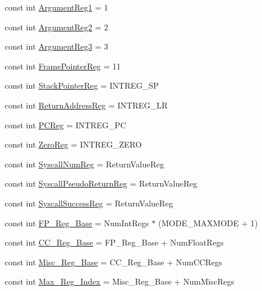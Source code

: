 \begin{DoxyCompactItemize}
const int \hyperlink{namespaceArmISA_af987b699db00f70e6b0d77312e87b602}{ArgumentReg1} = 1
\item 
const int \hyperlink{namespaceArmISA_a9228292e340b262f43392ff8b1e439db}{ArgumentReg2} = 2
\item 
const int \hyperlink{namespaceArmISA_a951253d463ad7c65cb79fc65b97df41c}{ArgumentReg3} = 3
\item 
const int \hyperlink{namespaceArmISA_aabd6fa5889c9ccc124dfd4a984046f6f}{FramePointerReg} = 11
\item 
const int \hyperlink{namespaceArmISA_a95d0846360ad0e64cb42fda7268a6434}{StackPointerReg} = INTREG\_\-SP
\item 
const int \hyperlink{namespaceArmISA_a99ba4a35fbf9debeb1f7ddb1db7b9967}{ReturnAddressReg} = INTREG\_\-LR
\item 
const int \hyperlink{namespaceArmISA_a48a12b34df10db73eb0f38fbc8d3820f}{PCReg} = INTREG\_\-PC
\item 
const int \hyperlink{namespaceArmISA_a33dbba4a12f6733a5ecc2d2b3542b7ee}{ZeroReg} = INTREG\_\-ZERO
\item 
const int \hyperlink{namespaceArmISA_ab258e2663398d45bb2996ff71313c4db}{SyscallNumReg} = ReturnValueReg
\item 
const int \hyperlink{namespaceArmISA_ab566b6da98edbb32e80291edaf0906ba}{SyscallPseudoReturnReg} = ReturnValueReg
\item 
const int \hyperlink{namespaceArmISA_a5b14981f767959a404638f100f655dfd}{SyscallSuccessReg} = ReturnValueReg
\item 
const int \hyperlink{namespaceArmISA_a833d6deee31e8a9398618efdc22effde}{FP\_\-Reg\_\-Base} = NumIntRegs $\ast$ (MODE\_\-MAXMODE + 1)
\item 
const int \hyperlink{namespaceArmISA_ab1d4916ec3ee18e808b3452603742d38}{CC\_\-Reg\_\-Base} = FP\_\-Reg\_\-Base + NumFloatRegs
\item 
const int \hyperlink{namespaceArmISA_a0ff03b99f2760c682de4e9cb0a3cd8a1}{Misc\_\-Reg\_\-Base} = CC\_\-Reg\_\-Base + NumCCRegs
\item 
const int \hyperlink{namespaceArmISA_a436c085ed5c04b95a1c0cbcc728c39d4}{Max\_\-Reg\_\-Index} = Misc\_\-Reg\_\-Base + NumMiscRegs
\end{DoxyCompactItemize}
